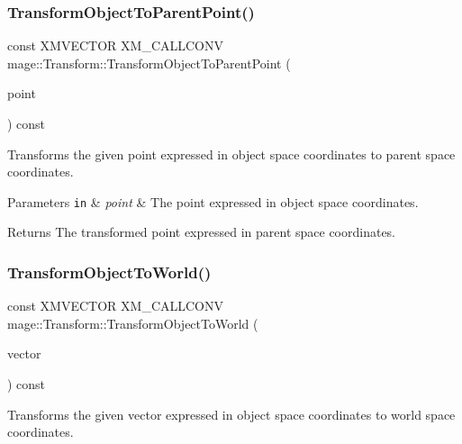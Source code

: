 \subsubsection{\texorpdfstring{Transform\+Object\+To\+Parent\+Point()}{TransformObjectToParentPoint()}}
{\footnotesize\ttfamily const X\+M\+V\+E\+C\+T\+OR X\+M\+\_\+\+C\+A\+L\+L\+C\+O\+NV mage\+::\+Transform\+::\+Transform\+Object\+To\+Parent\+Point (\begin{DoxyParamCaption}\item[{F\+X\+M\+V\+E\+C\+T\+OR}]{point }\end{DoxyParamCaption}) const\hspace{0.3cm}{\ttfamily [noexcept]}}

Transforms the given point expressed in object space coordinates to parent space coordinates.


\begin{DoxyParams}[1]{Parameters}
\mbox{\tt in}  & {\em point} & The point expressed in object space coordinates. \\
\hline
\end{DoxyParams}
\begin{DoxyReturn}{Returns}
The transformed point expressed in parent space coordinates. 
\end{DoxyReturn}
\mbox{\label{classmage_1_1_transform_a9d560741131cf68503e725346d681991}} 
\subsubsection{\texorpdfstring{Transform\+Object\+To\+World()}{TransformObjectToWorld()}}
{\footnotesize\ttfamily const X\+M\+V\+E\+C\+T\+OR X\+M\+\_\+\+C\+A\+L\+L\+C\+O\+NV mage\+::\+Transform\+::\+Transform\+Object\+To\+World (\begin{DoxyParamCaption}\item[{F\+X\+M\+V\+E\+C\+T\+OR}]{vector }\end{DoxyParamCaption}) const\hspace{0.3cm}{\ttfamily [noexcept]}}

Transforms the given vector expressed in object space coordinates to world space coordinates.


